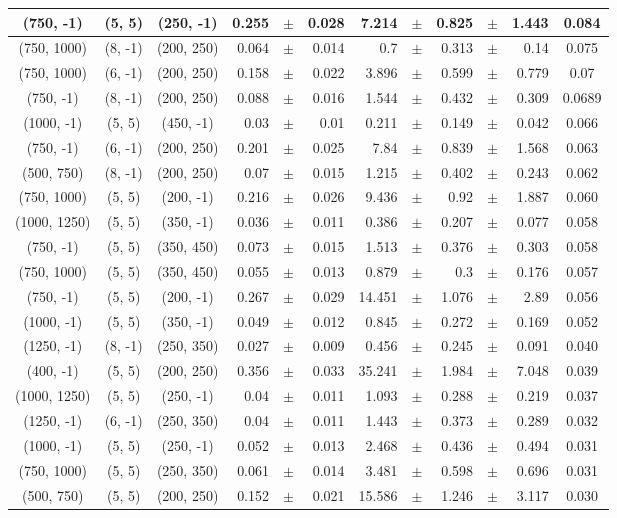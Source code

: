 \documentclass[12pt]{paper}
\begin{document}
\begin{table}[ht]
\begin{center}
{\begin{tabular}{|c|c|c|rrr|rrrrr|c|}
(750, -1)&(5, 5)&(250, -1)&0.255&$\pm$&0.028&7.214&$\pm$&0.825&$\pm$&1.443&0.084\\\hline
(750, 1000)&(8, -1)&(200, 250)&0.064&$\pm$&0.014&0.7&$\pm$&0.313&$\pm$&0.14&0.075\\\hline
(750, 1000)&(6, -1)&(200, 250)&0.158&$\pm$&0.022&3.896&$\pm$&0.599&$\pm$&0.779&0.07\\\hline
(750, -1)&(8, -1)&(200, 250)&0.088&$\pm$&0.016&1.544&$\pm$&0.432&$\pm$&0.309&0.0689\\\hline
(1000, -1)&(5, 5)&(450, -1)&0.03&$\pm$&0.01&0.211&$\pm$&0.149&$\pm$&0.042&0.066\\\hline
(750, -1)&(6, -1)&(200, 250)&0.201&$\pm$&0.025&7.84&$\pm$&0.839&$\pm$&1.568&0.063\\\hline
(500, 750)&(8, -1)&(200, 250)&0.07&$\pm$&0.015&1.215&$\pm$&0.402&$\pm$&0.243&0.062\\\hline
(750, 1000)&(5, 5)&(200, -1)&0.216&$\pm$&0.026&9.436&$\pm$&0.92&$\pm$&1.887&0.060\\\hline
(1000, 1250)&(5, 5)&(350, -1)&0.036&$\pm$&0.011&0.386&$\pm$&0.207&$\pm$&0.077&0.058\\\hline
(750, -1)&(5, 5)&(350, 450)&0.073&$\pm$&0.015&1.513&$\pm$&0.376&$\pm$&0.303&0.058\\\hline
(750, 1000)&(5, 5)&(350, 450)&0.055&$\pm$&0.013&0.879&$\pm$&0.3&$\pm$&0.176&0.057\\\hline
(750, -1)&(5, 5)&(200, -1)&0.267&$\pm$&0.029&14.451&$\pm$&1.076&$\pm$&2.89&0.056\\\hline
(1000, -1)&(5, 5)&(350, -1)&0.049&$\pm$&0.012&0.845&$\pm$&0.272&$\pm$&0.169&0.052\\\hline
(1250, -1)&(8, -1)&(250, 350)&0.027&$\pm$&0.009&0.456&$\pm$&0.245&$\pm$&0.091&0.040\\\hline
(400, -1)&(5, 5)&(200, 250)&0.356&$\pm$&0.033&35.241&$\pm$&1.984&$\pm$&7.048&0.039\\\hline
(1000, 1250)&(5, 5)&(250, -1)&0.04&$\pm$&0.011&1.093&$\pm$&0.288&$\pm$&0.219&0.037\\\hline
(1250, -1)&(6, -1)&(250, 350)&0.04&$\pm$&0.011&1.443&$\pm$&0.373&$\pm$&0.289&0.032\\\hline
(1000, -1)&(5, 5)&(250, -1)&0.052&$\pm$&0.013&2.468&$\pm$&0.436&$\pm$&0.494&0.031\\\hline
(750, 1000)&(5, 5)&(250, 350)&0.061&$\pm$&0.014&3.481&$\pm$&0.598&$\pm$&0.696&0.031\\\hline
(500, 750)&(5, 5)&(200, 250)&0.152&$\pm$&0.021&15.586&$\pm$&1.246&$\pm$&3.117&0.030\\\hline

\end{tabular}}
\end{center}
\end{table}
\end{document}
